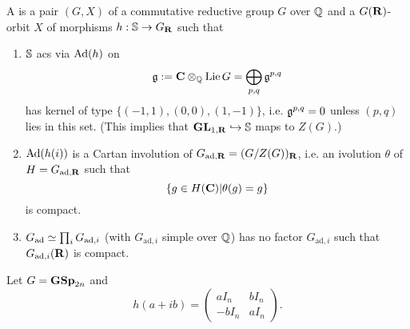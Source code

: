\begin{definition}
	A  is a pair $(G,X)$ of a commutative reductive group $G$ over $\Q$ and a $G(\R)$-orbit $X$ of morphisms $h:\S\to G_{\R}$ such that
	\begin{enumerate}[1)]
		\item $\S$ acs via $\Ad(h)$ on
			\[
				\kg \defeq \bb{C}\otimes_\Q \Lie G = \bigoplus_{p,q}\kg^{p,q}
			\] 
			has kernel of type $\{(-1,1), (0,0), (1,-1)\} $, i.e. $\kg^{p,q}=0$ unless $(p,q)$ lies in this set. (This implies that $\GL_{1,\R}\injto \S$ maps to $Z(G)$.)
		\item $\Ad(h(i))$ is a Cartan involution of $G_{\text{ad},\R} = (G /Z(G))_{\R}$, i.e. an ivolution $\theta$ of $H = G_{\text{ad},\R}$ such that
			\[
				\{g\in H(\bb{C}) | \theta(g)=g\} 
			\] 
			is compact.
		\item $G_{\text{ad}}\isoto\prod_i G_{\text{ad},i}$ (with $G_{\text{ad},i}$ simple over $\Q$) has no factor $G_{\text{ad},i}$ such that $G_{\text{ad},i}(\R)$ is compact.
	\end{enumerate}
\end{definition}
\begin{example}
	Let $G=\GSp_{2n}$ and
	\[
		h(a+ib) = \begin{pmatrix} aI_n & bI_n \\ -bI_n & aI_n \end{pmatrix} .
	\] 
\end{example}


